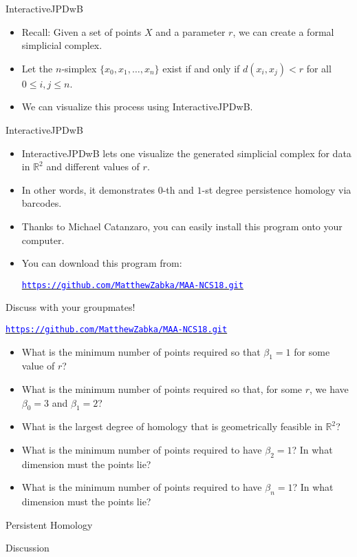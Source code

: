 \begin{frame}{InteractiveJPDwB}
\begin{itemize}
\item Recall: Given a set of points $X$ and a parameter $r$, we can create a formal simplicial complex.
\item Let the $n$-simplex $\{x_0, x_1, \ldots, x_n\}$ exist if and only if $d(x_i, x_j) < r$ for all $0 \leq i,j\leq n$. 
\item We can visualize this process using InteractiveJPDwB.
\end{itemize}
\end{frame}

\begin{frame}{InteractiveJPDwB}
\begin{itemize}
\item InteractiveJPDwB \cite{Wolcott2016InteractiveJPDwB} lets one visualize the generated simplicial complex for data in $\mathbb{R}^2$ and different values of $r$.
\item In other words, it demonstrates $0$-th and $1$-st degree persistence homology via barcodes.
\item Thanks to Michael Catanzaro, you can easily install this program onto your computer.
\item You can download this program from:
\begin{center}
\hyperref[https://github.com/MatthewZabka/MAA-NCS18.git]{\textcolor{blue}{\texttt{https://github.com/MatthewZabka/MAA-NCS18.git}}}
\end{center}
\end{itemize}
\end{frame}
\begin{frame}{Discuss with your groupmates!}
\begin{center}
\hyperref[https://github.com/MatthewZabka/MAA-NCS18.git]{\textcolor{blue}{\texttt{https://github.com/MatthewZabka/MAA-NCS18.git}}}
\end{center}
\begin{itemize}
\item What is the minimum number of points required so that $\beta_1 = 1$ for some value of $r$?
\item What is the minimum number of points required so that, for some $r$, we have $\beta_0 = 3$ and $\beta_1 = 2$?
\item What is the largest degree of homology that is geometrically feasible in $\mathbb{R}^2$?
\item What is the minimum number of points required to have $\beta_2 = 1$? In what dimension must the points lie?
\item What is the minimum number of points required to have $\beta_n = 1$?  In what dimension must the points lie?
\end{itemize}
\end{frame}
\begin{frame}{Persistent Homology}
\begin{center}
{\Huge Discussion}
\end{center}
\end{frame}
